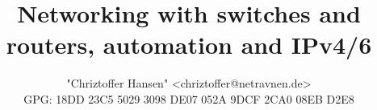 \documentclass[a4paper,12pt,twoside,twocolumn,landscape]{book}
\title{Networking with switches and routers, automation and IPv4/6}
\author{"Chriztoffer Hansen" <chriztoffer@netravnen.de>\\
    GPG: 18DD 23C5 5029 3098 DE07  052A 9DCF 2CA0 08EB D2E8}
\begin{document}

\tableofcontents

\setlength{\parskip}{0.35em} %
\renewcommand{\baselinestretch}{1.15} %

















\clearpage
\printglossary[type=\acronymtype,title=Special Terms,toctitle=List of terms]


\renewcommand{\listfigurename}{List of {\footnotesize hidden} Figures}
\listoffigures


\renewcommand{\listtablename}{Tables {\footnotesize hidding} on the pages}
\listoftables




\end{document}
